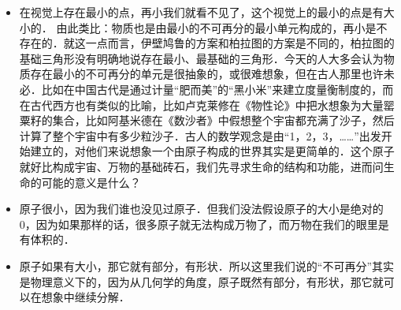 \begin{itemize}
\item 在视觉上存在最小的点，再小我们就看不见了，这个视觉上的最小的点是有大小的． 由此类比：物质也是由最小的不可再分的最小单元构成的，再小是不存在的．就这一点而言，伊壁鸠鲁的方案和柏拉图的方案是不同的，柏拉图的基础三角形没有明确地说存在最小、最基础的三角形．今天的人大多会认为物质存在最小的不可再分的单元是很抽象的，或很难想象，但在古人那里也许未必．比如在中国古代是通过计量“肥而美”的“黑小米”来建立度量衡制度的，而在古代西方也有类似的比喻，比如卢克莱修在《物性论》中把水想象为大量罂粟籽的集合，比如阿基米德在《数沙者》中假想整个宇宙都充满了沙子，然后计算了整个宇宙中有多少粒沙子．古人的数学观念是由“1，2，3，\dots\dots”出发开始建立的，对他们来说想象一个由原子构成的世界其实是更简单的．这个原子就好比构成宇宙、万物的基础砖石，我们先寻求生命的结构和功能，进而问生命的可能的意义是什么？

\item 原子很小，因为我们谁也没见过原子．但我们没法假设原子的大小是绝对的0，因为如果那样的话，很多原子就无法构成万物了，而万物在我们的眼里是有体积的．

\item 原子如果有大小，那它就有部分，有形状．所以这里我们说的“不可再分”其实是物理意义下的，因为从几何学的角度，原子既然有部分，有形状，那它就可以在想象中继续分解．
\end{itemize}
